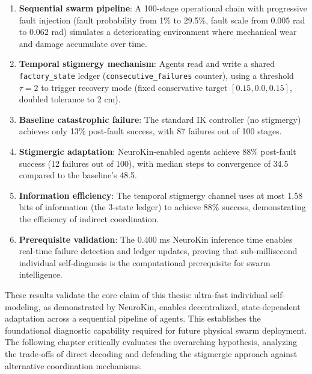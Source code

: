 ﻿\documentclass[12pt,a4paper,oneside]{report}
\begin{document}
\begin{enumerate}
    \item \textbf{Sequential swarm pipeline}: A 100-stage operational chain with progressive fault injection (fault probability from 1\% to 29.5\%, fault scale from 0.005 rad to 0.062 rad) simulates a deteriorating environment where mechanical wear and damage accumulate over time.
    \item \textbf{Temporal stigmergy mechanism}: Agents read and write a shared \texttt{factory\_state} ledger (\texttt{consecutive\_failures} counter), using a threshold $\tau = 2$ to trigger recovery mode (fixed conservative target $[0.15, 0.0, 0.15]$, doubled tolerance to 2 cm).
    \item \textbf{Baseline catastrophic failure}: The standard IK controller (no stigmergy) achieves only 13\% post-fault success, with 87 failures out of 100 stages.
    \item \textbf{Stigmergic adaptation}: NeuroKin-enabled agents achieve 88\% post-fault success (12 failures out of 100), with median steps to convergence of 34.5 compared to the baseline's 48.5.
    \item \textbf{Information efficiency}: The temporal stigmergy channel uses at most 1.58 bits of information (the 3-state ledger) to achieve 88\% success, demonstrating the efficiency of indirect coordination.
    \item \textbf{Prerequisite validation}: The 0.400 ms NeuroKin inference time enables real-time failure detection and ledger updates, proving that sub-millisecond individual self-diagnosis is the computational prerequisite for swarm intelligence.
\end{enumerate}

These results validate the core claim of this thesis: ultra-fast individual self-modeling, as demonstrated by NeuroKin, enables decentralized, state-dependent adaptation across a sequential pipeline of agents. This establishes the foundational diagnostic capability required for future physical swarm deployment. The following chapter critically evaluates the overarching hypothesis, analyzing the trade-offs of direct decoding and defending the stigmergic approach against alternative coordination mechanisms.
\end{document}
